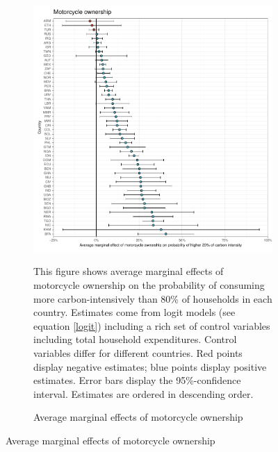  \begin{figure}[ht!]\ContinuedFloat
   \centering
   \begin{subfigure}[b]{\textwidth}
   \centering
   \includegraphics{1_Figures/Analysis_Logit_Models_Marginal_Effects/Average_Marginal_Effects_affected_upper_80_motorcycle.01_2017B.pdf}
   \caption{Average marginal effects of motorcycle ownership} \label{fig:Logit_ME_motorcycle}
   \begin{subcaption2}
     This figure shows average marginal effects of motorcycle ownership on the probability of consuming more carbon-intensively than 80\% of households in each country. Estimates come from logit models (see equation \ref{logit}) including a rich set of control variables including total household expenditures. Control variables differ for different countries. Red points display negative estimates; blue points display positive estimates. Error bars display the 95\%-confidence interval. Estimates are ordered in descending order.
   \end{subcaption2}
   \end{subfigure}
 \end{figure}
 \clearpage

